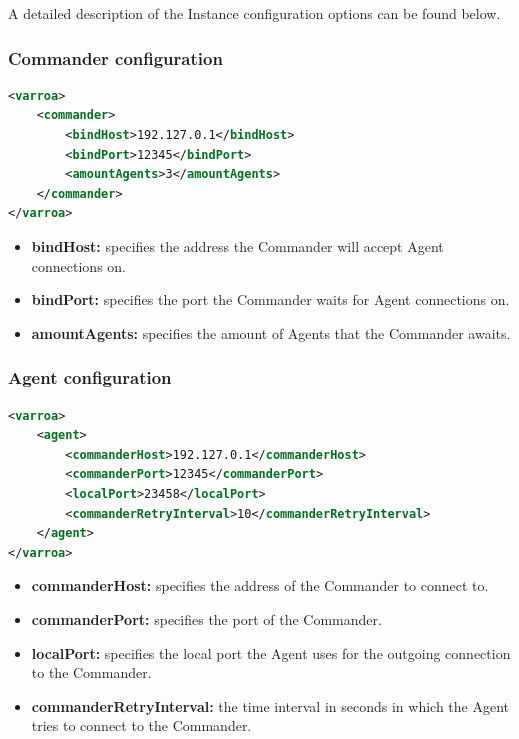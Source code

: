 A detailed description of the Instance configuration options can be found below.

\subsubsection{Commander configuration}\label{sec:commanderConfig}
\begin{lstlisting}[caption={Commander XML configuration example}, captionpos=b, label={lst:commanderConfig}, language=XML]
<varroa>
    <commander>
		<bindHost>192.127.0.1</bindHost>
        <bindPort>12345</bindPort>
        <amountAgents>3</amountAgents>
    </commander>
</varroa>
\end{lstlisting}
\begin{itemize}
	\item \textbf{bindHost:} specifies the address the Commander will accept Agent connections on.
	\item \textbf{bindPort:} specifies the port the Commander waits for Agent connections on.
	\item \textbf{amountAgents:} specifies the amount of Agents that the Commander awaits.
\end{itemize}

\subsubsection{Agent configuration}\label{sec:agentConfig}
\begin{lstlisting}[caption={Agent XML configuration example}, captionpos=b, label={lst:agentConfig}, language=XML]
<varroa>
    <agent>
		<commanderHost>192.127.0.1</commanderHost>
        <commanderPort>12345</commanderPort>
        <localPort>23458</localPort>
		<commanderRetryInterval>10</commanderRetryInterval>
    </agent>
</varroa>
\end{lstlisting}
\begin{itemize}
	\item \textbf{commanderHost:} specifies the address of the Commander to connect to.
	\item \textbf{commanderPort:} specifies the port of the Commander.
	\item \textbf{localPort:} specifies the local port the Agent uses for the outgoing connection to the Commander.
	\item \textbf{commanderRetryInterval:} the time interval in seconds in which the Agent tries to connect to the Commander.
\end{itemize}

